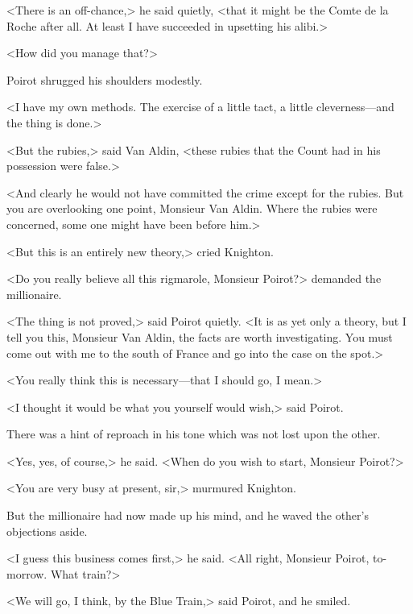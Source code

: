 <There is an off-chance,> he said quietly, <that it might be the Comte de la Roche after all. At least I have succeeded in upsetting his alibi.>

<How did you manage that?>

Poirot shrugged his shoulders modestly.

<I have my own methods. The exercise of a little tact, a little cleverness—and the thing is done.>

<But the rubies,> said Van Aldin, <these rubies that the Count had in his possession were false.>

<And clearly he would not have committed the crime except for the rubies. But you are overlooking one point, Monsieur Van Aldin. Where the rubies were concerned, some one might have been before him.>

<But this is an entirely new theory,> cried Knighton.

<Do you really believe all this rigmarole, Monsieur Poirot?> demanded the millionaire.

<The thing is not proved,> said Poirot quietly. <It is as yet only a theory, but I tell you this, Monsieur Van Aldin, the facts are worth investigating. You must come out with me to the south of France and go into the case on the spot.>

<You really think this is necessary—that I should go, I mean.>

<I thought it would be what you yourself would wish,> said Poirot.

There was a hint of reproach in his tone which was not lost upon the other.

<Yes, yes, of course,> he said. <When do you wish to start, Monsieur Poirot?>

<You are very busy at present, sir,> murmured Knighton.

But the millionaire had now made up his mind, and he waved the other's objections aside.

<I guess this business comes first,> he said. <All right, Monsieur Poirot, to-morrow. What train?>

<We will go, I think, by the Blue Train,> said Poirot, and he smiled.